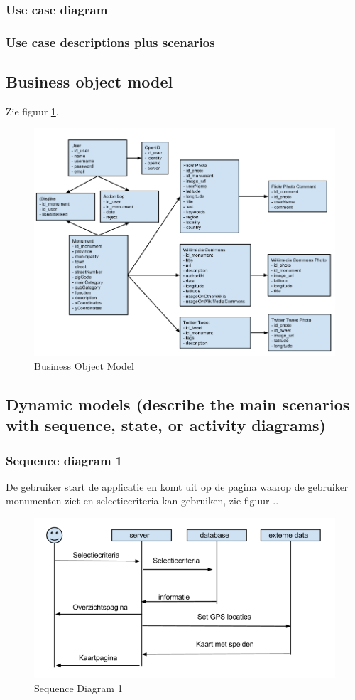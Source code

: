 \documentclass[a4paper,10pt]{article}
\begin{document}
	\subsubsection{Use case diagram}
	\subsubsection{Use case descriptions plus scenarios}
	
	\subsection{Business object model}
		Zie figuur \ref{bom}.
		\begin{figure}[ht!]
			\centering
			\includegraphics[width=\textwidth]{BusinessObjectModel.png}
			\caption{Business Object Model \label{bom}}
		\end{figure}
		\subsection{Dynamic models (describe the main scenarios with sequence, state, or activity diagrams)}
			\subsubsection{Sequence diagram 1}
			De gebruiker start de applicatie en komt uit op de pagina waarop de gebruiker monumenten ziet en selectiecriteria kan gebruiken, zie figuur .. %
			\begin{figure}[ht!]
				\centering
				\includegraphics[width=\textwidth]{sequence1.png}
				\caption{Sequence Diagram 1 \label{sequence1}}
			\end{figure}
\end{document}
